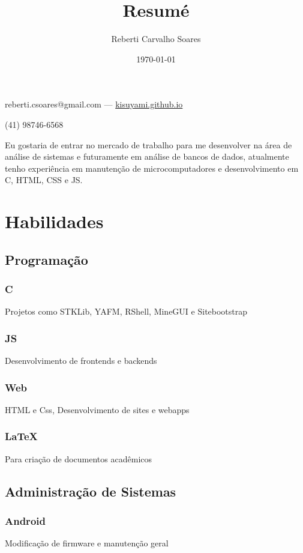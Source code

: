 \documentclass[11pt]{article}
\author{Reberti Carvalho Soares}
\date{\today}
\title{Resumé}
\begin{document}
\begin{center}
  {\huge\bfseries
    \theauthor}

    \vspace{.25em}
    reberti.csoares@gmail.com --- \url{kisuyami.github.io}

    \vspace{.25em}
    (41) 98746-6568

\end{center}

Eu gostaria de entrar no mercado de trabalho para me desenvolver na área
de análise de sistemas e futuramente em análise de bancos de dados,
atualmente tenho experiência em manutenção de microcomputadores e
desenvolvimento em C, HTML, CSS e JS.

\section{Habilidades}
\label{sec:org8fa75f0}
\subsection{Programação}
\label{sec:org3018f13}
\subsubsection{C}
\label{sec:org6755492}
Projetos como STKLib, YAFM, RShell, MineGUI e Sitebootstrap
\subsubsection{JS}
\label{sec:org15b4aea}
Desenvolvimento de frontends e backends
\subsubsection{Web}
\label{sec:org3a17634}
HTML e Css, Desenvolvimento de sites e webapps
\subsubsection{\LaTeX{}}
\label{sec:orgf733208}
Para criação de documentos acadêmicos

\subsection{Administração de Sistemas}
\label{sec:orgb9bc848}
\subsubsection{Android}
\label{sec:org25f8f4d}
Modificação de firmware e manutenção geral
\end{document}
